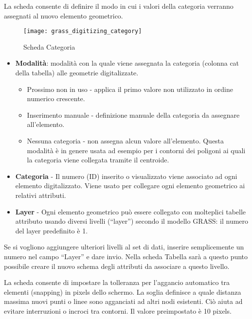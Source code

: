 
La scheda  consente di definire il modo in cui i valori
della categoria verranno assegnati al nuovo elemento geometrico.

\begin{figure}[h]
 \centering
  \texttt{[image: grass\_digitizing\_category]}
  \caption{Scheda Categoria \nixcaption}\label{fig:grass_digitizing_category}
 \end{figure}

\begin{itemize}[label=--]
\item \textbf{Modalità}: modalità con la quale viene assegnata la categoria
(colonna cat della tabella) alle geometrie digitalizzate.
\begin{itemize}
\item Prossimo non in uso - applica il primo valore non utilizzato in ordine
numerico crescente.
\item Inserimento manuale - definizione manuale della categoria da assegnare
all'elemento.
\item Nessuna categoria - non assegna alcun valore all'elemento. Questa
modalità è in genere usata ad esempio per i contorni dei poligoni ai quali la
categoria viene collegata tramite il centroide.
\end{itemize}
\item \textbf{Categoria} - Il numero (ID) inserito o visualizzato viene
associato ad ogni elemento digitalizzato. Viene usato per collegare ogni
elemento geometrico ai relativi attributi.
\item \textbf{Layer} - Ogni elemento geometrico può essere collegato
con molteplici tabelle attributo usando diversi livelli (``layer'') secondo il
modello GRASS: il numero del layer predefinito è 1. 
\end{itemize}

\begin{Tip}\caption{\textsc{Creare un livello GRASS aggiuntivo con QGIS}}
Se si vogliono aggiungere ulteriori livelli al set di dati, inserire
semplicemente un numero nel campo ``Layer'' e dare invio. Nella scheda
Tabella sarà a questo punto possibile creare il nuovo schema degli attributi
da associare a questo livello.
\end{Tip}

\label{label_settingtab}

La scheda  consente di impostare la tolleranza per
l'aggancio automatico tra elementi (snapping) in pixels dello schermo. La
soglia definisce a quale distanza massima nuovi punti o linee sono agganciati
ad altri nodi esistenti. Ciò aiuta ad evitare interruzioni o incroci tra
contorni. Il valore preimpostato è 10 pixels.

